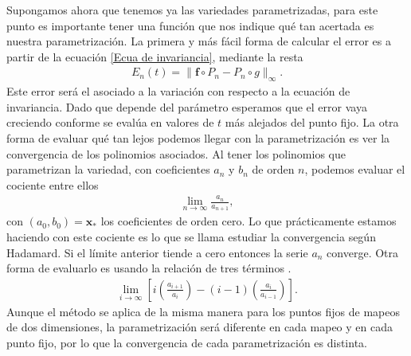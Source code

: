 Supongamos ahora que tenemos ya las variedades parametrizadas, para este punto es importante tener una función que nos indique qué tan acertada es nuestra parametrización. La primera y más fácil forma de calcular el error es a partir de la ecuación \eqref{Ecua de invariancia}, mediante la resta
\begin{eqnarray}
E_{n}(t) = \parallel \mathbf{f} \circ P_{n} - P_{n} \circ g \parallel_{\infty}.  \label{Ecua de invariancia resta}
\end{eqnarray}
Este error será el asociado a la variación con respecto a la ecuación de invariancia. Dado que depende del parámetro esperamos que el error vaya creciendo conforme se evalúa en valores de $t$ más alejados del punto fijo. La otra forma de evaluar qué tan lejos podemos llegar con la parametrización es ver la convergencia de los polinomios asociados. Al tener los polinomios que parametrizan la variedad, con coeficientes $a_{n}$ y $b_{n}$ de orden $n$, podemos evaluar el cociente entre ellos
\begin{eqnarray}
\lim_{n\rightarrow\infty}\frac{a_{n}}{a_{n+1}},\label{hadamard}
\end{eqnarray} 
con $(a_{0},b_{0})=\mathbf{x}_{*}$ los coeficientes de orden cero. Lo que prácticamente estamos haciendo con este cociente es lo que se llama estudiar la convergencia según Hadamard. Si el límite anterior tiende a cero entonces la serie $a_{n}$ converge. Otra forma de evaluarlo es usando la relación de tres términos \citep{Chang}.
\begin{eqnarray}
\lim_{i\rightarrow\infty} \left[ i\left(\frac{a_{i+1}}{a_{i}}\right)-(i-1)\left(\frac{a_{i}}{a_{i-1}}\right) \right].
\label{tres terminos}
\end{eqnarray}
Aunque el método se aplica de la misma manera para los puntos fijos de mapeos de dos dimensiones, la parametrización será diferente en cada mapeo y en cada punto fijo, por lo que la convergencia de cada parametrización es distinta. 